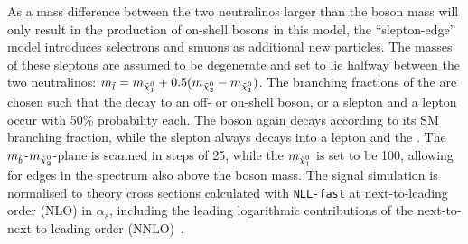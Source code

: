 As a mass difference between the two neutralinos larger than the \Z boson mass will only result in the production of on-shell \Z bosons in this model, the ``slepton-edge'' model introduces selectrons and smuons as additional new particles. The masses of these sleptons are assumed to be degenerate and set to lie halfway between the two neutralinos: $m_{\tilde{l}} = m_{{\tilde{\chi}^0_1}} + 0.5(m_{{\tilde{\chi}^0_2}}-m_{{\tilde{\chi}^0_1}})$. The branching fractions of the \secondchi are chosen such that the decay to an off- or on-shell \Z boson, or a slepton and a lepton occur with 50\% probability each. The \Z boson again decays according to its SM branching fraction, while the slepton always decays into a lepton and the \firstchi. The $m_{\tilde{b}}$-$m_{{\tilde{\chi}^0_2}}$-plane is scanned in steps of 25\GeV, while the $m_{{\tilde{\chi}^0_1}}$ is set to be 100\GeV, allowing for edges in the \mll spectrum also above the \Z boson mass. 
The signal simulation is normalised to theory cross sections calculated with \verb+NLL-fast+ at next-to-leading order (NLO) in $\alpha_s$, including the leading logarithmic contributions of the next-to-next-to-leading order (NNLO)~\cite{bib-nlo-nll-01,bib-nlo-nll-02,bib-nlo-nll-03,bib-nlo-nll-04,bib-nlo-nll-05,ref:xsec}.

